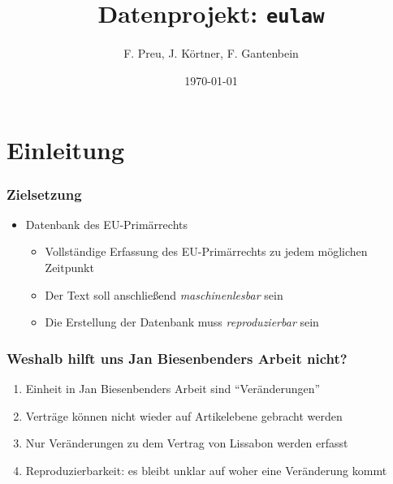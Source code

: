 \documentclass[xcolor=dvipsnames]{beamer} %
\date{\today}
\title{Datenprojekt: \texttt{eulaw}}
\author{F. Preu, J. Körtner, F. Gantenbein}
\begin{document}
\frame{
\maketitle
}

\section{Einleitung}

\begin{frame}
  \frametitle{Zielsetzung}
  \begin{itemize}
  \item Datenbank des EU-Primärrechts
    \begin{itemize}
    \item Vollständige Erfassung des EU-Primärrechts zu jedem möglichen Zeitpunkt
    \item Der Text soll anschließend \textit{maschinenlesbar} sein
    \item Die Erstellung der Datenbank muss \textit{reproduzierbar} sein
    \end{itemize}
  \end{itemize}
\end{frame}


\begin{frame}
  \frametitle{Weshalb hilft uns Jan Biesenbenders Arbeit nicht?}
  \begin{enumerate}
  \item Einheit in Jan Biesenbenders Arbeit sind \enquote{Veränderungen}
  \item Verträge können nicht wieder auf Artikelebene gebracht werden
  \item Nur Veränderungen zu dem Vertrag von Lissabon werden erfasst
  \item Reproduzierbarkeit: es bleibt unklar auf woher eine Veränderung kommt
  \end{enumerate}
\end{frame}
\end{document}
